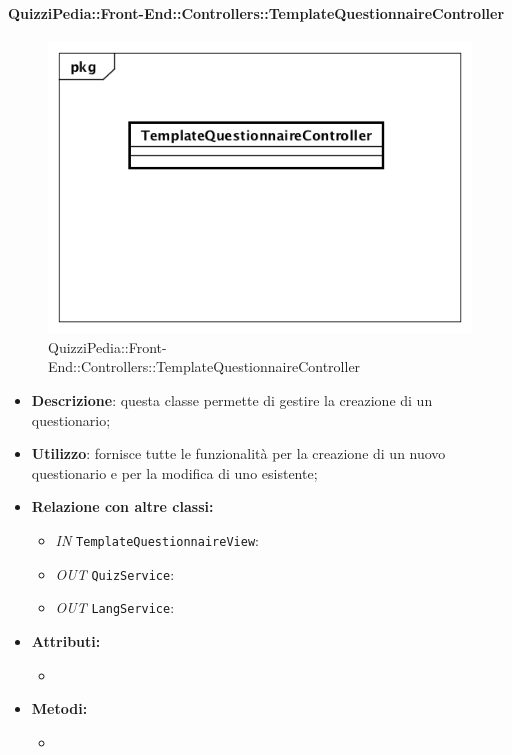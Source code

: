 \paragraph{QuizziPedia::Front-End::Controllers::TemplateQuestionnaireController}
\begin{figure}
	\centering
	\includegraphics[scale=0.45]{UML/Classi/Front-End/QuizziPedia_Front-end_Controller_TemplateQuestionnaireController.png}
	\caption{QuizziPedia::Front-End::Controllers::TemplateQuestionnaireController}
\end{figure}
\begin{itemize}
	\item \textbf{Descrizione}: questa classe permette di gestire la creazione di un questionario;
	\item \textbf{Utilizzo}: fornisce tutte le funzionalità per la creazione di un nuovo questionario e per la modifica di uno esistente;
	\item \textbf{Relazione con altre classi:}
	\begin{itemize}
		\item \textit{IN} \texttt{TemplateQuestionnaireView}:  
		\item \textit{OUT} \texttt{QuizService}: 
		\item \textit{OUT} \texttt{LangService}: 
	\end{itemize}
	\item \textbf{Attributi:}
	\begin{itemize}
		\item 
	\end{itemize}
	\item \textbf{Metodi:}
	\begin{itemize}
		\item 
	\end{itemize}
\end{itemize}

